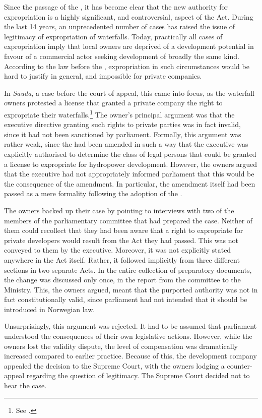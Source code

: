 Since the passage of the \cite{wra00}, it has become clear that the new authority for expropriation is a highly significant, and controversial, aspect of the Act. During the last 14 years, an unprecedented number of cases has raised the issue of legitimacy of expropriation of waterfalls. Today, practically all cases of expropriation imply that local owners are deprived of a development potential in favour of a commercial actor seeking development of broadly the same kind. According to the law before the \cite{wra00}, expropriation in such circumstances would be hard to justify in general, and impossible for private companies.

In {\it Sauda}, a case before the court of appeal, this came into focus, as the waterfall owners protested a license that granted a private company the right to expropriate their waterfalls.\footnote{See \cite{sauda09}.} The owner's principal argument was that the executive directive granting such rights to private parties was in fact invalid, since it had not been sanctioned by parliament. Formally, this argument was rather weak, since the \cite{ea59} had been amended in such a way that the executive was explicitly authorised to determine the class of legal persons that could be granted a license to expropriate for hydropower development. However, the owners argued that the executive had not appropriately informed parliament that this would be the consequence of the amendment. In particular, the amendment itself had been passed as a mere formality following the adoption of the \cite{wra00}. 

The owners backed up their case by pointing to interviews with two of the members of the parliamentary committee that had prepared the case. Neither of them could recollect that they had been aware that a right to expropriate for private developers would result from the Act they had passed. This was not conveyed to them by the executive. Moreover, it was not explicitly stated anywhere in the Act itself. Rather, it followed implicitly from three different sections in two separate Acts. In the entire collection of preparatory documents, the change was discussed only once, in the report from the committee to the Ministry. This, the owners argued, meant that the purported authority was not in fact constitutionally valid, since parliament had not intended that it should be introduced in Norwegian law.

Unsurprisingly, this argument was rejected. It had to be assumed that parliament understood the consequences of their own legislative actions. However, while the owners lost the validity dispute, the level of compensation was dramatically increased compared to earlier practice. Because of this, the development company appealed the decision to the Supreme Court, with the owners lodging a counter-appeal regarding the question of legitimacy. The Supreme Court decided not to hear the case. 

